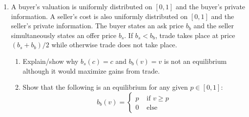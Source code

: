\documentclass[a4paper,12pt]{article}
\begin{document}
\begin{enumerate}
\item A buyer's valuation is uniformly distributed on $[0,1]$ and the buyer's private information. A seller's cost is also uniformly distributed on $[0,1]$ and the seller's private information. The buyer states an ask price $b_b$ and the seller simultaneously states an offer price $b_s$. If $b_s<b_b$, trade takes place at price $(b_s+b_b)/2$ while otherwise trade does not take place.
  \begin{enumerate}
  \item Explain/show why $b_s(c)=c$ and $b_b(v)=v$ is not an equilibrium although it would maximize gains from trade. 
  \item Show that the following is an equilibrium for any given $p\in[0,1]$:
    \begin{equation*}
      b_b(v)=
      \begin{cases}
        p & \text{ if }v\geq p\\
        0 & \text{ else }

\end{cases}
\end{equation*}
\end{enumerate}
\end{enumerate}
\end{document}
